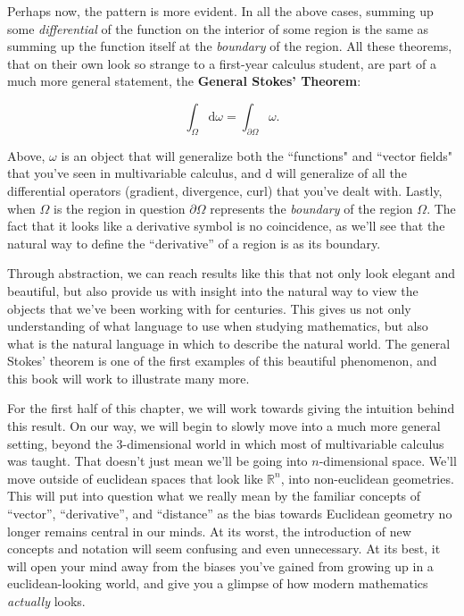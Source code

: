	Perhaps now, the pattern is more evident. In all the above cases, summing up some \emph{differential} of the function on the interior of some region is the same as summing up the function itself at the \emph{boundary} of the region. All these theorems, that on their own look so strange to a first-year calculus student, are part of a much more general statement, the \textbf{General Stokes' Theorem}:

	\begin{theorem}\label{thm:GeneralStokes}
		\begin{equation} \label{eq:GeneralStokes}
			\int_\Omega \mathrm d \omega = \int_{\partial \Omega} \omega.
		\end{equation}
	\end{theorem}

	

	
	Above, $\omega$ is an object that will generalize both the ``functions" and ``vector fields" that you've seen in multivariable calculus, and $\mathrm d$ will generalize of all the differential operators (gradient, divergence, curl) that you've dealt with. Lastly, when $\Omega$ is the region in question $\partial \Omega$ represents the \emph{boundary} of the region $\Omega$. The fact that it looks like a derivative symbol is no coincidence, as we'll see that the natural way to define the ``derivative'' of a region is as its boundary.
	
	
	Through abstraction, we can reach results like this that not only look elegant and beautiful, but also provide us with insight into the natural way to view the objects that we've been working with for centuries. This gives us not only understanding of what language to use when studying mathematics, but also what is the natural language in which to describe the natural world. The general Stokes' theorem is one of the first examples of this beautiful phenomenon, and this book will work to illustrate many more. 
	
	
	For the first half of this chapter, we will work towards giving the intuition behind  this result. On our way, we will begin to slowly move into a much more general setting, beyond the $3$-dimensional world in which most of multivariable calculus was taught. That doesn't just mean we'll be going into $n$-dimensional space. We'll move outside of euclidean spaces that look like $\mathbb{R}^n$, into non-euclidean geometries. This will put into question what we really mean by the familiar concepts of ``vector'', ``derivative'', and ``distance'' as the bias towards Euclidean geometry no longer remains central in our minds. At its worst, the introduction of new concepts and notation will seem confusing and even unnecessary. At its best, it will open your mind away from the biases you've gained from growing up in a euclidean-looking world, and give you a glimpse of how modern mathematics \emph{actually} looks. 
	
